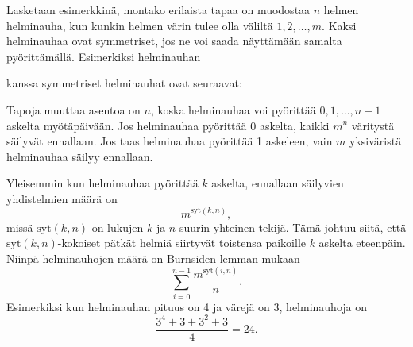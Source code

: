Lasketaan esimerkkinä, montako
erilaista tapaa on
muodostaa $n$ helmen helminauha,
kun kunkin helmen värin tulee olla
väliltä $1,2,\ldots,m$.
Kaksi helminauhaa ovat symmetriset,
jos ne voi saada näyttämään samalta pyörittämällä.
Esimerkiksi helminauhan
\begin{center}
\end{center}
kanssa symmetriset helminauhat ovat seuraavat:
\begin{center}
\end{center}
Tapoja muuttaa asentoa on $n$,
koska helminauhaa voi pyörittää $0,1,\ldots,n-1$
askelta myötäpäivään.
Jos helminauhaa pyörittää 0 askelta,
kaikki $m^n$ väritystä säilyvät ennallaan.
Jos taas helminauhaa pyörittää 1 askeleen,
vain $m$ yksiväristä helminauhaa säilyy ennallaan.

Yleisemmin kun helminauhaa pyörittää $k$ askelta,
ennallaan säilyvien yhdistelmien määrä on
\[m^{\textrm{syt}(k,n)},\]
missä $\textrm{syt}(k,n)$ on lukujen $k$ ja $n$
suurin yhteinen tekijä.
Tämä johtuu siitä, että $\textrm{syt}(k,n)$-kokoiset
pätkät helmiä siirtyvät toistensa paikoille
$k$ askelta eteenpäin.
Niinpä helminauhojen määrä on
Burnsiden lemman mukaan
\[\sum_{i=0}^{n-1} \frac{m^{\textrm{syt}(i,n)}}{n}. \]
Esimerkiksi kun helminauhan pituus on 4
ja värejä on 3, helminauhoja on
\[\frac{3^4+3+3^2+3}{4} = 24. \]

